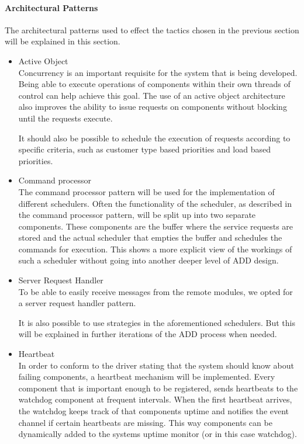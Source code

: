\paragraph{Architectural Patterns}
The architectural patterns used to effect the tactics chosen in the previous section will be explained in this section. 
\begin{itemize}
	\item Active Object \\
	Concurrency is an important requisite for the system that is being developed. Being able to execute operations of components within their own threads of control can help achieve this goal. The use of an active object architecture also improves the ability to issue requests on components without blocking until the requests execute.

It should also be possible to schedule the execution of requests according to specific criteria, such as customer type based priorities and load based priorities.

	\item Command processor \\
	The command processor pattern will be used for the implementation of different schedulers. Often the functionality of the scheduler, as described in the command processor pattern, will be split up into two separate components. 
These components are the buffer where the service requests are stored and the actual scheduler that empties the buffer and schedules the commands for execution. This shows a more explicit view of the workings of such a scheduler without going into another deeper level of ADD design.

	\item Server Request Handler \\
	To be able to easily receive messages from the remote modules, we opted
		for a server request handler pattern.

It is also possible to use strategies in the aforementioned schedulers. But this will be explained in further iterations of the ADD process when needed. 
	 \item Heartbeat \\
	In order to conform to the driver stating that the system should know about failing components, a heartbeat mechanism will be implemented. 
Every component that is important enough to be registered, sends heartbeats to the watchdog component at frequent intervals. 
When the first heartbeat arrives, the watchdog keeps track of that components uptime and notifies the event channel if certain heartbeats are missing. 
This way components can be dynamically added to the systems uptime monitor (or in this case watchdog). 


\end{itemize}
